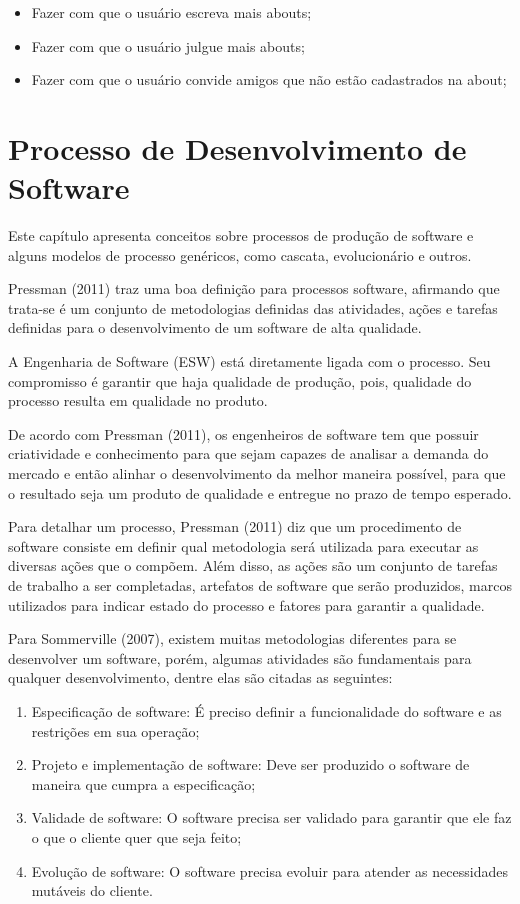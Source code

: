 \begin{itemize}
    \item Fazer com que o usuário escreva mais abouts;
    \item Fazer com que o usuário julgue mais abouts;
    \item Fazer com que o usuário convide amigos que não estão cadastrados na about;
\end{itemize}

\section{Processo de Desenvolvimento de Software}
\label{sec:processo_de_desenvolvimento_de_software}
Este capítulo apresenta conceitos sobre processos de produção de software e alguns modelos de processo genéricos, como cascata, evolucionário e outros.

Pressman (2011) traz uma boa definição para processos software, afirmando que trata-se é um conjunto de metodologias definidas das atividades, ações e tarefas definidas para o desenvolvimento de um software de alta qualidade.

A Engenharia de Software (ESW) está diretamente ligada com o processo. Seu compromisso é garantir que haja qualidade de produção, pois, qualidade do processo resulta em qualidade no produto. 

De acordo com Pressman (2011), os engenheiros de software tem que possuir criatividade e conhecimento para que sejam capazes de analisar a demanda do mercado e então alinhar o desenvolvimento da melhor maneira possível, para que o resultado seja um produto de qualidade e entregue no prazo de tempo esperado.

 Para detalhar um processo, Pressman (2011) diz que um procedimento de software consiste em definir qual metodologia será utilizada para executar as diversas ações que o compõem. Além disso, as ações são um conjunto de tarefas de trabalho a ser completadas, artefatos de software que serão produzidos, marcos utilizados para indicar estado do processo e fatores para garantir a qualidade. 

Para Sommerville (2007), existem muitas metodologias diferentes para se desenvolver um software, porém, algumas atividades são fundamentais para qualquer desenvolvimento, dentre elas são citadas as seguintes:

\begin{enumerate}
    \item Especificação de software: É preciso definir a funcionalidade do software e as restrições em sua operação;

    \item Projeto e implementação de software: Deve ser produzido o software de maneira que cumpra a especificação;

    \item Validade de software: O software precisa ser validado para garantir que ele faz o que o cliente quer que seja feito;

    \item Evolução de software: O software precisa evoluir para atender as necessidades mutáveis do cliente.
\end{enumerate}


